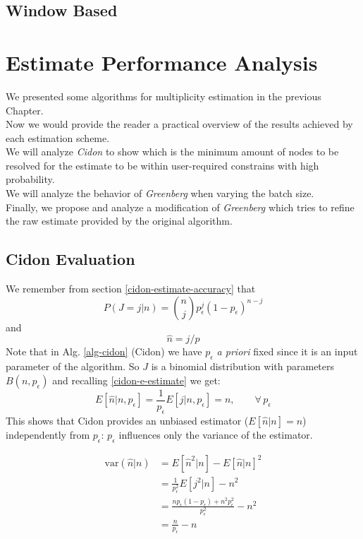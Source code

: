 \documentclass[12pt,a4paper]{report}
\newcommand{\pc}{p_{\epsilon}}
\begin{document}
\section{Window Based}
\chapter{Estimate Performance Analysis}
\label{ch:Performance Analysis}

We presented some algorithms for multiplicity estimation in the previous Chapter.\\ Now we would provide the reader a practical overview of the results achieved by each estimation scheme.\\
We will analyze \emph{Cidon} to show which is the minimum amount of nodes to be resolved for the estimate to be within user-required constrains with high probability.\\  
We will analyze the behavior of \emph{Greenberg} when varying the batch size.\\
Finally, we propose and analyze a modification of \emph{Greenberg} which tries to refine the raw estimate provided by the original algorithm.
\section{Cidon Evaluation}

\begin{equation*}
\end{equation*}
We remember from section \ref{cidon-estimate-accuracy} that
\begin{equation*}P(J=j|n)={n \choose j}\pc^{j}(1-\pc)^{n-j}\end{equation*}
and
\begin{equation*}\hat{n}=j/p\end{equation*}
Note that  in Alg. \ref{alg-cidon} (Cidon) we have $\pc$ \emph{a priori} fixed since it is an input parameter of the algorithm. So $J$ is a binomial distribution with parameters $B(n,\pc)$ and recalling \eqref{cidon-e-estimate}
we get:
\begin{equation}
E[\hat{n}|n,\pc]=\frac{1}{\pc}E\left[j|n,\pc\right]=n, \qquad \forall \,\pc
\end{equation}
This shows that Cidon provides an unbiased estimator ($E[\hat{n}|n]=n$) independently from $\pc$: $\pc$ influences only the variance of the estimator. 

\begin{equation}
\begin{split}
\textrm{var}(\hat{n}|n) & =E[\hat{n}^{2}|n]- E[\hat{n}|n]^{2}\\
& = \frac{1}{\pc^{2}}E[j^{2}|n] - n^{2}\\
& = \frac{n\pc(1-\pc)+n^{2}\pc^{2}}{\pc^{2}}- n^{2}\\
& =  \frac{n}{\pc}-n
\end{split}
\end{equation}
\end{document}
